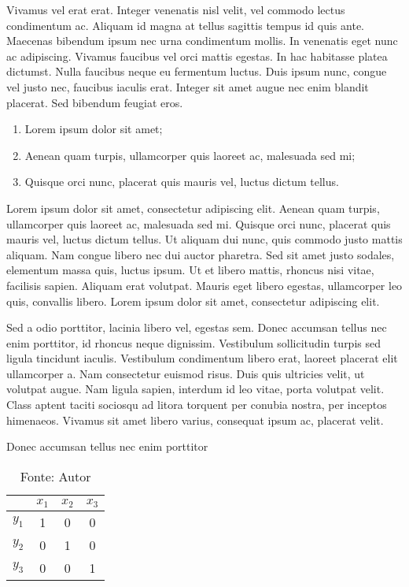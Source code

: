 \documentclass[rascunho,xindy]{fei}
\begin{document}
Vivamus vel erat erat. Integer venenatis nisl velit, vel commodo lectus condimentum ac. Aliquam id magna at tellus sagittis tempus id quis ante. Maecenas bibendum ipsum nec urna condimentum mollis. In venenatis eget nunc ac adipiscing. Vivamus faucibus vel orci mattis egestas. In hac habitasse platea dictumst. Nulla faucibus neque eu fermentum luctus. Duis ipsum nunc, congue vel justo nec, faucibus iaculis erat. Integer sit amet augue nec enim blandit placerat. Sed bibendum feugiat eros.

\begin{enumerate}
	\item Lorem ipsum dolor sit amet;
	\item Aenean quam turpis, ullamcorper quis laoreet ac, malesuada sed mi;
	\item Quisque orci nunc, placerat quis mauris vel, luctus dictum tellus.
\end{enumerate}

Lorem ipsum dolor sit amet, consectetur adipiscing elit. Aenean quam turpis, ullamcorper quis laoreet ac, malesuada sed mi. Quisque orci nunc, placerat quis mauris vel, luctus dictum tellus. Ut aliquam dui nunc, quis commodo justo mattis aliquam. Nam congue libero nec dui auctor pharetra. Sed sit amet justo sodales, elementum massa quis, luctus ipsum. Ut et libero mattis, rhoncus nisi vitae, facilisis sapien. Aliquam erat volutpat. Mauris eget libero egestas, ullamcorper leo quis, convallis libero. Lorem ipsum dolor sit amet, consectetur adipiscing elit.

Sed a odio porttitor, lacinia libero vel, egestas sem. Donec accumsan tellus nec enim porttitor, id rhoncus neque dignissim. Vestibulum sollicitudin turpis sed ligula tincidunt iaculis. Vestibulum condimentum libero erat, laoreet placerat elit ullamcorper a. Nam consectetur euismod risus. Duis quis ultricies velit, ut volutpat augue. Nam ligula sapien, interdum id leo vitae, porta volutpat velit. Class aptent taciti sociosqu ad litora torquent per conubia nostra, per inceptos himenaeos. Vivamus sit amet libero varius, consequat ipsum ac, placerat velit.

\begin{table}[ht!]
    \caption{Donec accumsan tellus nec enim porttitor} \label{tbl:exemplo}
    \centering
    \begin{tabular}{|c|c|c|c|}
    \hline 
     & \(x_1\) & \(x_2\) & \(x_3\) \\ 
    \hline 
    \(y_1\) & 1 & 0 & 0 \\ 
    \hline 
    \(y_2\) & 0 & 1 & 0 \\ 
    \hline 
    \(y_3\) & 0 & 0 & 1 \\ 
    \hline 
    \end{tabular}
    \caption*{Fonte: Autor}
\end{table}
\end{document}
